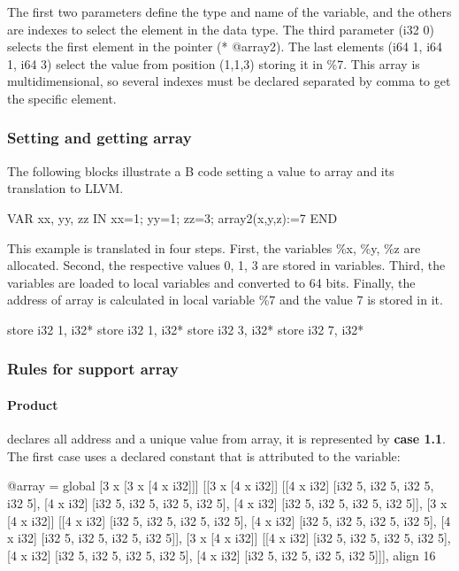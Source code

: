 The first two parameters define the type and name of the variable, and the
others are indexes to select the element in the data type. The third parameter (i32 0)
selects the first element in the pointer (* @array2). The last elements 
(i64 1, i64 1, i64 3) select the value from position (1,1,3) storing it in \%7.
This array is multidimensional, so several indexes must be declared separated
by comma to get the specific element.

\subsubsection{Setting and getting array}

The following blocks illustrate a B code setting a value to array
and its translation to LLVM. 

\begin{pascalcode} 
VAR xx, yy, zz IN
	xx=1;
	yy=1;
	zz=3;
	array2(x,y,z):=7
END
\end{pascalcode}

This example is translated in four steps. First, the variables \%x, \%y, \%z 
are allocated. Second, the respective values 0, 1, 3 are stored in variables. 
Third, the variables are loaded to local variables and converted to 64 bits. 
Finally, the address of array is calculated in local variable \%7 and the value 
7 is stored in it.  

\begin{llvmcode}
store i32 1, i32* %
store i32 1, i32* %
store i32 3, i32* %
store i32 7, i32* %
\end{llvmcode}


\subsubsection{Rules for support array}

\paragraph{Product} declares all address and a unique value from array, it is represented by \textbf{case 1.1}.
The first case uses a declared constant that is attributed to the variable:
\begin{llvmcode}
@array = global [3 x [3 x [4 x i32]]] 
[[3 x [4 x i32]] 
	[[4 x i32] [i32 5, i32 5, i32 5, i32 5], 
	 [4 x i32] [i32 5, i32 5, i32 5, i32 5], 
	 [4 x i32] [i32 5, i32 5, i32 5, i32 5]], 
 [3 x [4 x i32]] 
	[[4 x i32] [i32 5, i32 5, i32 5, i32 5],
	 [4 x i32] [i32 5, i32 5, i32 5, i32 5],
	 [4 x i32] [i32 5, i32 5, i32 5, i32 5]],
 [3 x [4 x i32]] 
	[[4 x i32] [i32 5, i32 5, i32 5, i32 5],
	 [4 x i32] [i32 5, i32 5, i32 5, i32 5], 
	 [4 x i32] [i32 5, i32 5, i32 5, i32 5]]], align 16
\end{llvmcode}

